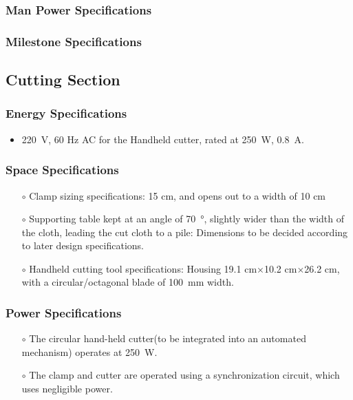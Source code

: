 \documentclass[12pt]{article}
\begin{document}
\subsubsection{Man Power Specifications}

\subsubsection{Milestone Specifications}

\subsection{Cutting Section}
\subsubsection{Energy Specifications}
\begin{itemize}
    \item \SI{220}{\volt}, 60 Hz AC for the Handheld cutter, rated at \SI{250}{\watt}, \SI{0.8}{\ampere}.
\end{itemize}
\subsubsection{Space Specifications}
\begin{itemize}
    \item[$\scriptstyle\circ$] Clamp sizing specifications: 15 \unit{\centi\metre}, and opens out to a width of 10 \unit{\centi\metre}
    \item[$\scriptstyle\circ$] Supporting table kept at an angle of \SI{70}{\degree}, slightly wider than the width of the cloth, leading the cut cloth to a pile: Dimensions to be decided according to later design specifications. 
    \item[$\scriptstyle\circ$] Handheld cutting tool specifications: Housing 19.1 \unit{\centi\metre}$\times$10.2 \unit{\centi\metre}$\times$26.2 \unit{\centi\metre}, with a circular/octagonal blade of \SI{100}{\milli\meter} width.
\end{itemize}
\subsubsection{Power Specifications}
\begin{itemize}
    \item[$\scriptstyle\circ$] The circular hand-held cutter(to be integrated into an automated mechanism) operates at \SI{250}{\watt}.
    \item[$\scriptstyle\circ$] The clamp and cutter are operated using a synchronization circuit, which uses negligible power.
\end{itemize}
\end{document}
